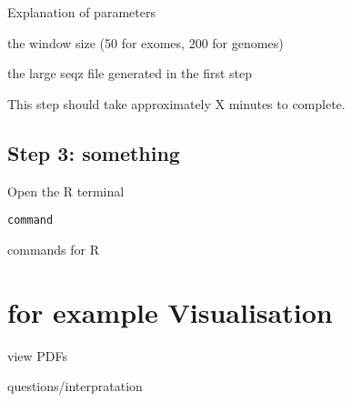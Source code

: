 \begin{note}
Explanation of parameters
\begin{description}[style=multiline,labelindent=0cm,align=right,leftmargin=\descriptionlabelspace,rightmargin=1.5cm,font=\ttfamily]
 \item[-w] the window size (50 for exomes, 200 for genomes)
 \item[-s] the large seqz file generated in the first step
\end{description}
\end{note}

This step should take approximately X minutes to complete.


\subsection{Step 3: something}

\begin{steps}
Open the R terminal
\begin{lstlisting}
command
\end{lstlisting}
\end{steps}

commands for R


\newpage


\section{for example Visualisation}

view PDFs

questions/interpratation


\newpage


